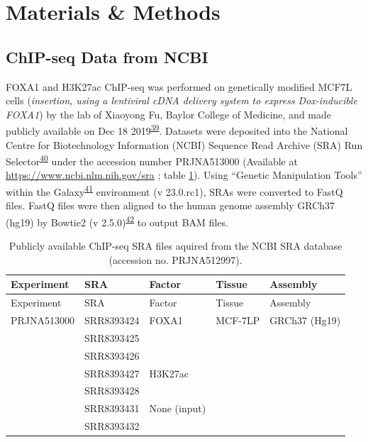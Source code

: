 \documentclass[
  12pt,
]{article}
\begin{document}
\hypertarget{materials-methods}{%
\section{Materials \& Methods}\label{materials-methods}}

\hypertarget{chip-seq-data-from-ncbi}{%
\subsection{ChIP-seq Data from NCBI}\label{chip-seq-data-from-ncbi}}

FOXA1 and H3K27ac ChIP-seq was performed on genetically modified MCF7L cells (\emph{insertion, using a lentiviral cDNA delivery system to express Dox-inducible FOXA1}) by the lab of Xiaoyong Fu, Baylor College of Medicine, and made publicly available on Dec 18 2019\textsuperscript{\protect\hyperlink{ref-fu2019}{39}}.
Datasets were deposited into the National Centre for Biotechnology Information (NCBI) Sequence Read Archive (SRA) Run Selector\textsuperscript{\protect\hyperlink{ref-leinonen2010}{40}} under the accession number PRJNA513000 (Available at \url{https://www.ncbi.nlm.nih.gov/sra} ; table \ref{tab:data}).
Using ``Genetic Manipulation Tools'' within the Galaxy\textsuperscript{\protect\hyperlink{ref-thegala2022}{41}} environment (v 23.0.rc1), SRAs were converted to FastQ files.
FastQ files were then aligned to the human genome assembly GRCh37 (hg19) by Bowtie2 (v 2.5.0)\textsuperscript{\protect\hyperlink{ref-langmead2012}{42}} to output BAM files.

\begin{longtable}[]{@{}lllll@{}}
\caption{\label{tab:data}Publicly available ChIP-seq SRA files aquired from the NCBI SRA database (accession no. PRJNA512997).}\tabularnewline
\toprule()
Experiment & SRA & Factor & Tissue & Assembly \\
\midrule()
\endfirsthead
\toprule()
Experiment & SRA & Factor & Tissue & Assembly \\
\midrule()
\endhead
PRJNA513000 & SRR8393424 & FOXA1 & MCF-7LP & GRCh37 (Hg19) \\
& SRR8393425 & & & \\
& SRR8393426 & & & \\
& SRR8393427 & H3K27ac & & \\
& SRR8393428 & & & \\
& SRR8393431 & None (input) & & \\
& SRR8393432 & & & \\
\bottomrule()
\end{longtable}
\end{document}
